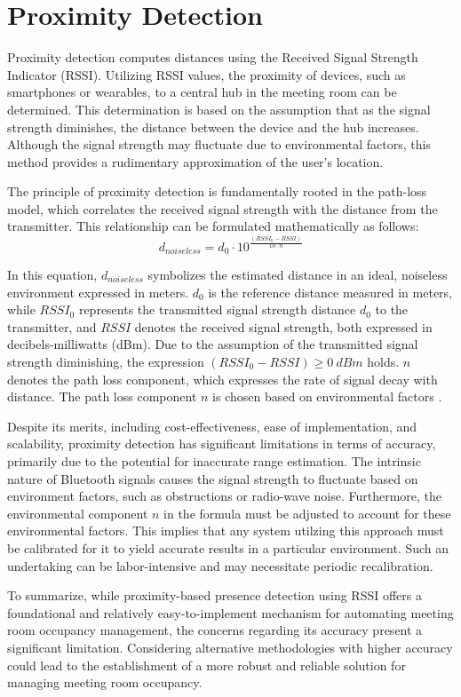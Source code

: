 \section{Proximity Detection}\label{sec:proximity_detection}
Proximity detection computes distances using the Received Signal Strength Indicator (RSSI).
Utilizing RSSI values, the proximity of devices, such as smartphones or wearables, to a central hub in the meeting room can be determined. 
This determination is based on the assumption that as the signal strength diminishes, the distance between the device and the hub increases. 
Although the signal strength may fluctuate due to environmental factors, this method provides a rudimentary approximation of the user's location.\cite{spachosBLEBeaconsIndoor2020}

The principle of proximity detection is fundamentally rooted in the path-loss model, which correlates the received signal strength with the distance from the transmitter. This relationship can be formulated mathematically as follows:\cite{spachosBLEBeaconsIndoor2020}
$$
d_{noiseless} = d_0 \cdot 10^{ \frac{(RSSI_{0} - RSSI)}{10 \cdot n}}
$$

In this equation, \(d_{noiseless}\) symbolizes the estimated distance in an ideal, noiseless environment expressed in meters.
$d_0$ is the reference distance measured in meters, while \(RSSI_{0}\) represents the transmitted signal strength distance $d_0$ to the transmitter, and \(RSSI\) denotes the received signal strength, both expressed in decibels-milliwatts (dBm). 
Due to the assumption of the transmitted signal strength diminishing, the expression $(RSSI_{0} - RSSI) \geq 0\ dBm$ holds. 
\(n\) denotes the path loss component, which expresses the rate of signal decay with distance.  
The path loss component \(n\) is chosen based on environmental factors \cite{spachosBLEBeaconsIndoor2020}. 

Despite its merits, including cost-effectiveness, ease of implementation, and scalability, proximity detection has significant limitations in terms of accuracy, primarily due to the potential for inaccurate range estimation. 
The intrinsic nature of Bluetooth signals causes the signal strength to fluctuate based on environment factors, such as obstructions or radio-wave noise.\cite{spachosBLEBeaconsIndoor2020} 
Furthermore, the environmental component $n$ in the formula must be adjusted to account for these environmental factors.  
This implies that any system utilzing this approach must be calibrated for it to yield accurate results in a particular environment. 
Such an undertaking can be labor-intensive and may necessitate periodic recalibration.\cite{spachosBLEBeaconsIndoor2020}

To summarize, while proximity-based presence detection using RSSI offers a foundational and relatively easy-to-implement mechanism for automating meeting room occupancy management, the concerns regarding its accuracy present a significant limitation. 
Considering alternative methodologies with higher accuracy could lead to the establishment of a more robust and reliable solution for managing meeting room occupancy.

